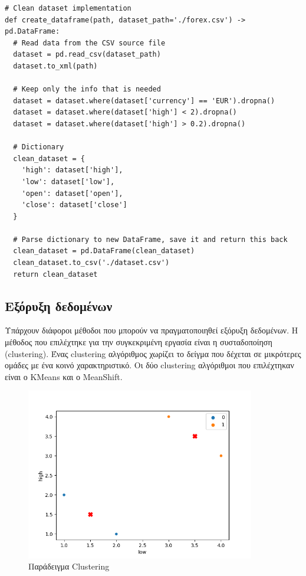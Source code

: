 \begin{verbatim}
# Clean dataset implementation
def create_dataframe(path, dataset_path='./forex.csv') -> pd.DataFrame:
  # Read data from the CSV source file
  dataset = pd.read_csv(dataset_path)
  dataset.to_xml(path)

  # Keep only the info that is needed
  dataset = dataset.where(dataset['currency'] == 'EUR').dropna()
  dataset = dataset.where(dataset['high'] < 2).dropna()
  dataset = dataset.where(dataset['high'] > 0.2).dropna()

  # Dictionary
  clean_dataset = {
    'high': dataset['high'],
    'low': dataset['low'],
    'open': dataset['open'],
    'close': dataset['close']
  }

  # Parse dictionary to new DataFrame, save it and return this back
  clean_dataset = pd.DataFrame(clean_dataset)
  clean_dataset.to_csv('./dataset.csv')
  return clean_dataset
\end{verbatim}

\subsection{Εξόρυξη δεδομένων}

Υπάρχουν διάφοροι μέθοδοι που μπορούν να πραγματοποιηθεί εξόρυξη δεδομένων. Η μέθοδος που επιλέχτηκε για την συγκεκριμένη εργασία είναι η συσταδοποίηση (clustering). Ένας clustering αλγόριθμος χωρίζει το δείγμα που δέχεται σε μικρότερες ομάδες με ένα κοινό χαρακτηριστικό. Οι δύο clustering αλγόριθμοι που επιλέχτηκαν είναι ο KMeans και ο MeanShift.

\begin{figure}[H]
  \centering
  \includegraphics[width=100mm]{Figures/k_means_example.png}
  \caption{Παράδειγμα Clustering}
  \label{fig:example}
\end{figure}

